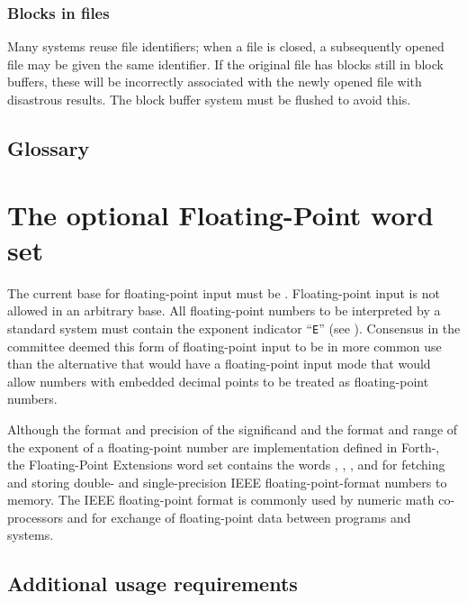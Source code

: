 \setcounter{subsubsection}{1}
\subsubsection{Blocks in files} %

Many systems reuse file identifiers; when a file is closed, a
subsequently opened file may be given the same identifier. If the
original file has blocks still in block buffers, these will be
incorrectly associated with the newly opened file with disastrous
results. The block buffer system must be flushed to avoid this.

\setcounter{subsection}{5}
\subsection{Glossary} %



\section{The optional Floating-Point word set} %
\label{rat:floating}

	The current base for floating-point input must be .
	Floating-point input is not allowed in an arbitrary base. All
	floating-point numbers to
	be interpreted by a standard system must contain the exponent
	indicator ``\texttt{E}'' (see ). Consensus in the committee deemed
	this form of floating-point input to be in more common use than
	the alternative that would have a floating-point input mode that
	would allow numbers with embedded decimal points to be treated
	as floating-point numbers.

	Although the format and precision of the significand and the format
	and range of the exponent of a floating-point number are
	implementation defined in Forth-\snapshot, the Floating-Point
	Extensions word set contains the words
	, , , and 
	for fetching and storing double- and single-precision IEEE
	floating-point-format numbers to memory. The IEEE floating-point
	format is commonly used by numeric math co-processors and for
	exchange of floating-point data between programs and systems.

\setcounter{subsection}{2}
\subsection{Additional usage requirements} %


